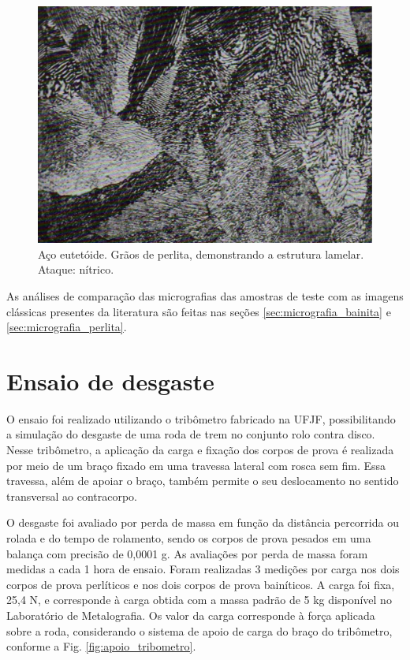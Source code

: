 \documentclass[
12pt,
openany, %
oneside, %
a4paper,			
english,			
brazil			        %
]{abntbibufjf}
\begin{document}
	\begin{figure}[H]
		\centering
		\includegraphics[width=1\textwidth]{perlita_bib}
		\caption{Aço eutetóide. Grãos de perlita, demonstrando a estrutura lamelar. Ataque: nítrico. \cite{colpaert1994metalografia}}
		\label{fig:perlita_bib}
	\end{figure}

	As análises de comparação das micrografias das amostras de teste com as imagens clássicas presentes da literatura são feitas nas seções \ref{sec:micrografia_bainita} e \ref{sec:micrografia_perlita}.
	
	
	

\pagebreak
\section{Ensaio de desgaste}
	O ensaio foi realizado utilizando o tribômetro fabricado na UFJF, possibilitando a simulação do desgaste de uma roda de trem no conjunto rolo contra disco. Nesse tribômetro, a aplicação da carga e fixação dos corpos de prova é realizada por meio de um braço fixado em uma travessa lateral com rosca sem fim. Essa travessa, além de apoiar o braço, também permite o seu deslocamento no sentido transversal ao contracorpo.
	
	O desgaste foi avaliado por perda de massa em função da distância percorrida ou rolada e do tempo de rolamento, sendo os corpos de prova pesados em uma balança com precisão de 0,0001 g. As avaliações por perda de massa foram medidas a cada 1 hora de ensaio. Foram realizadas 3 medições por carga nos dois corpos de prova perlíticos e nos dois corpos de prova bainíticos. A carga foi fixa, 25,4 N, e corresponde à carga obtida com a massa padrão de 5 kg disponível no Laboratório de Metalografia. Os valor da carga corresponde à força aplicada sobre a roda, considerando o sistema de apoio de carga do braço do tribômetro, conforme a Fig. \ref{fig:apoio_tribometro}.
	
\end{document}

